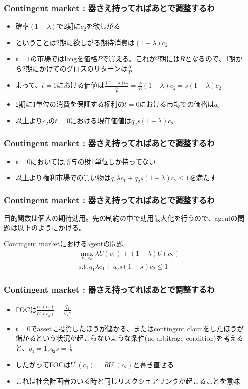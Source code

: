 \documentclass[dvipdfmx, 12pt]{beamer}
\begin{document}
\begin{frame}\frametitle{Contingent market : \small 器さえ持ってればあとで調整するわ}
	\begin{itemize}
		\item 確率$(1 -\lambda)$で2期に$c_2$を欲しがる
		\item ということは2期に欲しがる期待消費は$(1 - \lambda) c_2$
		\item $t = 1$の市場ではlongを価格$P$で買える。これが2期には$R$となるので、1期から2期にかけてのグロスのリターンは$\frac{R}{P}$
		\item よって、$t = 1$における価値は$\frac{(1 - \lambda) c_2}{\frac{R}{P}} = \frac{P}{R} (1 - \lambda) c_2 = s (1 - \lambda) c_2$
		\item 2期に1単位の消費を保証する権利の$t = 0$における市場での価格は$q_2$
		\item 以上より$c_2$の$t = 0$における現在価値は$q_2 s(1 - \lambda) c_2$
	\end{itemize}
\end{frame}
\begin{frame}\frametitle{Contingent market : \small 器さえ持ってればあとで調整するわ}
	\begin{itemize}
		\item $t = 0$においては所与の財1単位しか持ってない
		\item 以上より権利市場での買い物は$q_1 \lambda c_1 + q_2 s(1 - \lambda) c_2 \leq 1$を満たす
	\end{itemize}
\end{frame}
\begin{frame}\frametitle{Contingent market : \small 器さえ持ってればあとで調整するわ}
	目的関数は個人の期待効用。先の制約の中で効用最大化を行うので、agentの問題は以下のようにかける。
	\begin{itembox}[l]{Contingent marketにおけるagentの問題}
	\begin{align*}
		&\max_{c_1, c_2} \lambda U(c_1) + (1 - \lambda) U(c_2) \\
		&\text{s.t.}\
    		q_1 \lambda c_1 + q_2 s(1 - \lambda) c_2 \leq 1
	\end{align*}
	\end{itembox}
\end{frame}
\begin{frame}\frametitle{Contingent market : \small 器さえ持ってればあとで調整するわ}
	\begin{itemize}
		\item FOCは$\frac{U^{'}(c_1)}{U^{'}(c_2)} = \frac{q_1}{q_2 s}$
		\item $t = 0$でassetに投資したほうが儲かる、またはcontingent claimをしたほうが儲かるという状況が起こらないような条件(no-arbitrage condition)を考えると、$q_1 = 1, q_2 s = \frac{1}{R}$
		\item したがってFOCは$U^{'}(c_1) = R U^{'}(c_2)$と書き直せる
		\item これは社会計画者のいる時と同じリスクシェアリングが起こることを意味
	\end{itemize}
\end{frame}
\end{document}
